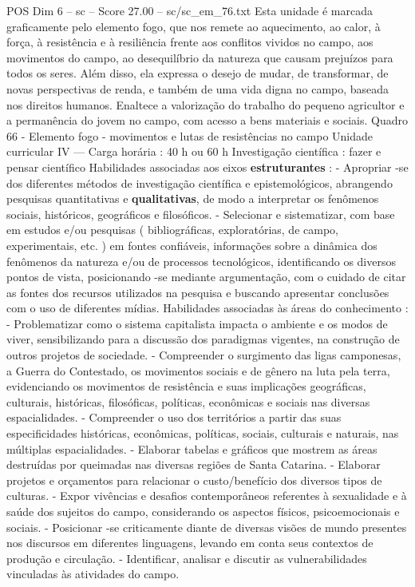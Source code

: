 \begin{textsample}{POS Dim 6 – sc – Score 27.00 – sc/sc\_em\_76.txt}
Esta unidade é marcada graficamente pelo elemento fogo, que nos remete ao aquecimento, ao calor, à força, à resistência e à resiliência frente aos conflitos vividos no campo, aos movimentos do campo, ao desequilíbrio da natureza que causam prejuízos para todos os seres.
Além disso, ela expressa o desejo de mudar, de transformar, de novas perspectivas de renda, e também de uma vida digna no campo, baseada nos direitos humanos.
Enaltece a valorização do trabalho do pequeno agricultor e a permanência do jovem no campo, com acesso a bens materiais e sociais.
Quadro 66 - Elemento fogo - movimentos e lutas de resistências no campo Unidade curricular IV — Carga horária : 40 h ou 60 h Investigação científica : fazer e pensar científico Habilidades associadas aos eixos \textbf{estruturantes} : - Apropriar -se dos diferentes métodos de investigação científica e epistemológicos, abrangendo pesquisas quantitativas e \textbf{qualitativas}, de modo a interpretar os fenômenos sociais, históricos, geográficos e filosóficos. - Selecionar e sistematizar, com base em estudos e/ou pesquisas ( bibliográficas, exploratórias, de campo, experimentais, etc. ) em fontes confiáveis, informações sobre a dinâmica dos fenômenos da natureza e/ou de processos tecnológicos, identificando os diversos pontos de vista, posicionando -se mediante argumentação, com o cuidado de citar as fontes dos recursos utilizados na pesquisa e buscando apresentar conclusões com o uso de diferentes mídias.
Habilidades associadas às áreas do conhecimento : - Problematizar como o sistema capitalista impacta o ambiente e os modos de viver, sensibilizando para a discussão dos paradigmas vigentes, na construção de outros projetos de sociedade. - Compreender o surgimento das ligas camponesas, a Guerra do Contestado, os movimentos sociais e de gênero na luta pela terra, evidenciando os movimentos de resistência e suas implicações geográficas, culturais, históricas, filosóficas, políticas, econômicas e sociais nas diversas espacialidades. - Compreender o uso dos territórios a partir das suas especificidades históricas, econômicas, políticas, sociais, culturais e naturais, nas múltiplas espacialidades. - Elaborar tabelas e gráficos que mostrem as áreas destruídas por queimadas nas diversas regiões de Santa Catarina. - Elaborar projetos e orçamentos para relacionar o custo/benefício dos diversos tipos de culturas. - Expor vivências e desafios contemporâneos referentes à sexualidade e à saúde dos sujeitos do campo, considerando os aspectos físicos, psicoemocionais e sociais. - Posicionar -se criticamente diante de diversas visões de mundo presentes nos discursos em diferentes linguagens, levando em conta seus contextos de produção e circulação. - Identificar, analisar e discutir as vulnerabilidades vinculadas às atividades do campo.

\end{textsample}
